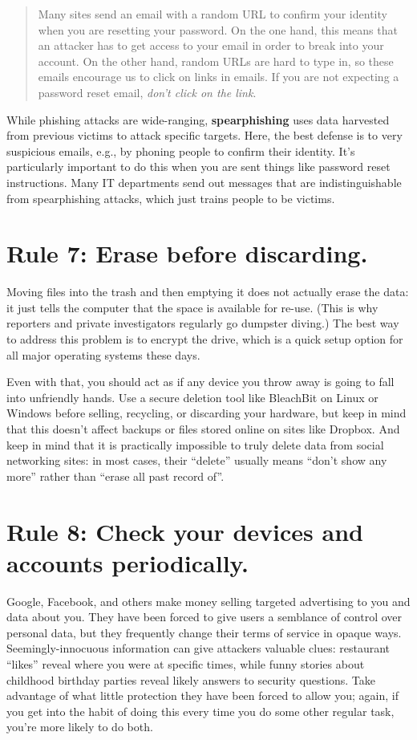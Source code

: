 \documentclass[10pt,letterpaper]{article}
\begin{document}
\begin{quote}
  Many sites send an email with a random URL to confirm your identity when you are resetting your password.
  On the one hand,
  this means that an attacker has to get access to your email in order to break into your account.
  On the other hand,
  random URLs are hard to type in,
  so these emails encourage us to click on links in emails.
  If you are not expecting a password reset email,
  \emph{don't click on the link}.
\end{quote}

While phishing attacks are wide-ranging,
\textbf{spearphishing} uses data harvested from previous victims to attack specific targets.
Here,
the best defense is to very suspicious emails,
e.g., by phoning people to confirm their identity.
It's particularly important to do this when you are sent
things like password reset instructions.
Many IT departments send out messages that are indistinguishable from spearphishing attacks,
which just trains people to be victims.

\section*{Rule 7: Erase before discarding.}

Moving files into the trash and then emptying it does not actually erase the data:
it just tells the computer that the space is available for re-use.
(This is why reporters and private investigators regularly go dumpster diving.)
The best way to address this problem is to encrypt the drive,
which is a quick setup option for all major operating systems these days.

Even with that,
you should act as if any device you throw away is going to fall into unfriendly hands.
Use a secure deletion tool like BleachBit on Linux or Windows
before selling, recycling, or discarding your hardware,
but keep in mind that this doesn't affect backups or files stored online
on sites like Dropbox.
And keep in mind that it is practically impossible to truly delete data from social networking sites:
in most cases,
their ``delete'' usually means ``don't show any more''
rather than ``erase all past record of''.

\section*{Rule 8: Check your devices and accounts periodically.}

Google, Facebook, and others make money selling targeted advertising to you and data about you.
They have been forced to give users a semblance of control over personal data,
but they frequently change their terms of service in opaque ways.
Seemingly-innocuous information can give attackers valuable clues:
restaurant ``likes'' reveal where you were at specific times,
while funny stories about childhood birthday parties reveal likely answers to security questions.
Take advantage of what little protection they have been forced to allow you;
again,
if you get into the habit of doing this every time you do some other regular task,
you're more likely to do both.
\end{document}
